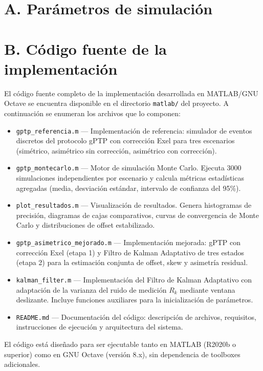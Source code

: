 
\chapter{A. Parámetros de simulación}
\label{ap:parametros}



\chapter{B. Código fuente de la implementación}
\label{ap:codigo}

El código fuente completo de la implementación desarrollada en MATLAB/GNU Octave se encuentra disponible en el directorio \texttt{matlab/} del proyecto. A continuación se enumeran los archivos que lo componen:

\begin{itemize}
\item \texttt{gptp\_referencia.m} --- Implementación de referencia: simulador de eventos discretos del protocolo gPTP con corrección Exel para tres escenarios (simétrico, asimétrico sin corrección, asimétrico con corrección).

\item \texttt{gptp\_montecarlo.m} --- Motor de simulación Monte Carlo. Ejecuta 3000 simulaciones independientes por escenario y calcula métricas estadísticas agregadas (media, desviación estándar, intervalo de confianza del 95\%).

\item \texttt{plot\_resultados.m} --- Visualización de resultados. Genera histogramas de precisión, diagramas de cajas comparativos, curvas de convergencia de Monte Carlo y distribuciones de offset estabilizado.

\item \texttt{gptp\_asimetrico\_mejorado.m} --- Implementación mejorada: gPTP con corrección Exel (etapa 1) y Filtro de Kalman Adaptativo de tres estados (etapa 2) para la estimación conjunta de offset, skew y asimetría residual.

\item \texttt{kalman\_filter.m} --- Implementación del Filtro de Kalman Adaptativo con adaptación de la varianza del ruido de medición $R_k$ mediante ventana deslizante. Incluye funciones auxiliares para la inicialización de parámetros.

\item \texttt{README.md} --- Documentación del código: descripción de archivos, requisitos, instrucciones de ejecución y arquitectura del sistema.
\end{itemize}

\vspace{0.5cm}
El código está diseñado para ser ejecutable tanto en MATLAB (R2020b o superior) como en GNU Octave (versión 8.x), sin dependencia de toolboxes adicionales.
